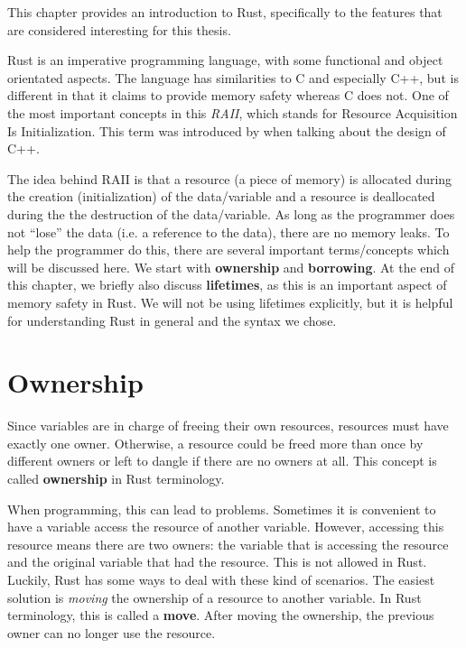 This chapter provides an introduction to Rust, specifically to the features that are considered interesting for this thesis. 

Rust is an imperative programming language, with some functional and object orientated aspects. The language has similarities to C and especially C++, but is different in that it claims to provide memory safety whereas C does not. One of the most important concepts in this \emph{RAII}, which stands for Resource Acquisition Is Initialization. This term was introduced by \cite{stroustrup1994design} when talking about the design of C++.

The idea behind RAII is that a resource (a piece of memory) is allocated during the creation (initialization) of the data/variable and a resource is deallocated during the the destruction of the data/variable. As long as the programmer does not ``lose'' the data (i.e. a reference to the data), there are no memory leaks. To help the programmer do this, there are several important terms/concepts which will be discussed here. We start with \textbf{ownership} and \textbf{borrowing}. At the end of this chapter, we briefly also discuss \textbf{lifetimes}, as this is an important aspect of memory safety in Rust. We will not be using lifetimes explicitly, but it is helpful for understanding Rust in general and the syntax we chose.  

\section{Ownership} %
Since variables are in charge of freeing their own resources, resources must have exactly one owner. Otherwise, a resource could be freed more than once by different owners or left to dangle if there are no owners at all. This concept is called \textbf{ownership} in Rust terminology. 

When programming, this can lead to problems. Sometimes it is convenient to have a variable access the resource of another variable. However, accessing this resource  means there are two owners: the variable that is accessing the resource and the original variable that had the resource. This is not allowed in Rust. Luckily, Rust has some ways to deal with these kind of scenarios. The easiest solution is \emph{moving} the ownership of a resource to another variable. In Rust terminology, this is called a \textbf{move}. After moving the ownership, the previous owner can no longer use the resource. 

